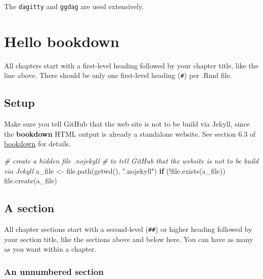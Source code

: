 \documentclass[
]{book}
\newenvironment{Shaded}{\begin{snugshade}}{\end{snugshade}}
\newcommand{\CommentTok}[1]{\textcolor[rgb]{0.56,0.35,0.01}{\textit{#1}}}
\newcommand{\ControlFlowTok}[1]{\textcolor[rgb]{0.13,0.29,0.53}{\textbf{#1}}}
\newcommand{\FunctionTok}[1]{\textcolor[rgb]{0.00,0.00,0.00}{#1}}
\newcommand{\NormalTok}[1]{#1}
\newcommand{\OtherTok}[1]{\textcolor[rgb]{0.56,0.35,0.01}{#1}}
\newcommand{\SpecialCharTok}[1]{\textcolor[rgb]{0.00,0.00,0.00}{#1}}
\newcommand{\StringTok}[1]{\textcolor[rgb]{0.31,0.60,0.02}{#1}}
\theoremstyle{definition}
\theoremstyle{definition}
\theoremstyle{definition}
\theoremstyle{definition}
\theoremstyle{remark}
\begin{document}
The \texttt{dagitty} and \texttt{ggdag} are used extensively.

\hypertarget{hello-bookdown}{%
\chapter{Hello bookdown}\label{hello-bookdown}}

All chapters start with a first-level heading followed by your chapter title, like the line above. There should be only one first-level heading (\texttt{\#}) per .Rmd file.

\hypertarget{setup}{%
\section{Setup}\label{setup}}

Make sure you tell GitHub that the web site is not to be build via Jekyll,
since the \textbf{bookdown} HTML output is already a standalone website. See
section 6.3 of \href{https://bookdown.org/yihui/bookdown/github.html}{bookdown} for
details.

\begin{Shaded}
\begin{Highlighting}[]
\CommentTok{\# create a hidden file .nojekyll}
\CommentTok{\# to tell GitHub that the website is not to be build via Jekyll}
\NormalTok{a\_file }\OtherTok{\textless{}{-}} \FunctionTok{file.path}\NormalTok{(}\FunctionTok{getwd}\NormalTok{(), }\StringTok{".nojekyll"}\NormalTok{)}
\ControlFlowTok{if}\NormalTok{ (}\SpecialCharTok{!}\FunctionTok{file.exists}\NormalTok{(a\_file)) }\FunctionTok{file.create}\NormalTok{(a\_file)}
\end{Highlighting}
\end{Shaded}

\hypertarget{a-section}{%
\section{A section}\label{a-section}}

All chapter sections start with a second-level (\texttt{\#\#}) or higher heading followed by your section title, like the sections above and below here. You can have as many as you want within a chapter.

\hypertarget{an-unnumbered-section}{%
\subsection*{An unnumbered section}\label{an-unnumbered-section}}
\end{document}
